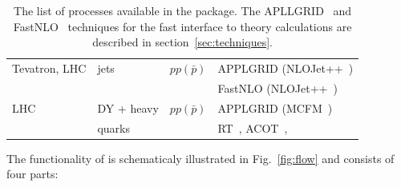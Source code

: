 \begin{table}
\begin{tabular}{|l|l|l|l|}
Tevatron, LHC &jets &$pp(\bar p)$ & APPLGRID (NLOJet++~\cite{Nagy:1998bb,Nagy:2001fj}) \\
                &  & & FastNLO (NLOJet++~\cite{Nagy:1998bb,Nagy:2001fj}) \\
LHC& DY + heavy &$pp(\bar p)$ & APPLGRID (MCFM~\cite{Campbell:1999ah,Campbell:2000je,Campbell:2010ff}) \\
   & quarks     &                 & RT~\cite{Thorne:1997ga,Thorne:2006qt,MSTWpdf,Thorne:6180}, ACOT~\cite{CWZ}, \\
\hline
\end{tabular}
\caption{The list of processes available in the \fitter package. 
The APLLGRID~\cite{Carli:2010rw} and FastNLO~\cite{Kluge:2006xs,Wobisch:2011ij,Britzger:2012bs} 
techniques for the fast interface to theory calculations are described in section~\ref{sec:techniques}.} 
\label{tab:proc}
\end{table}
%
\normalsize
The functionality of \fitter is schematicaly illustrated in Fig.~\ref{fig:flow} and consists of four parts: %

